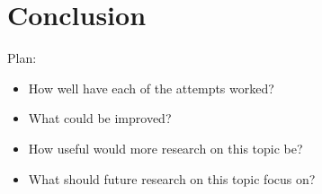 
\chapter{Conclusion}

Plan:
\begin{itemize}
    \item How well have each of the attempts worked?
    \item What could be improved?
    \item How useful would more research on this topic  be?
    \item What should future research on this topic focus on?
\end{itemize}

